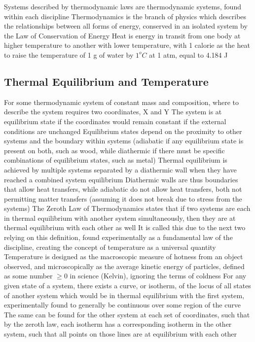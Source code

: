 \begin{outline*}
\2 Systems described by thermodynamic laws are thermodynamic systems, found within each discipline
\1 Thermodynamics is the branch of physics which describes the relationships between all forms of energy, conserved in an isolated system by the Law of Conservation of Energy
\2 Heat is energy in transit from one body at higher temperature to another with lower temperature, with 1 calorie as the heat to raise the temperature of 1 g of water by $1^oC$ at 1 atm, equal to 4.184 J
\end{outline*}
\subsection{Thermal Equilibrium and Temperature}
\begin{outline*}
\1 For some thermodynamic system of constant mass and composition, where to describe the system requires two coordinates, X and Y
\2 The system is at equilibrium state if the coordinates would remain constant if the external conditions are unchanged
\2 Equilibrium states depend on the proximity to other systems and the boundary within systems (adiabatic if any equilibrium state is present on both, such as wood, while diathermic if there must be specific combinations of equilibrium states, such as metal)
\3 Thermal equilibrium is achieved by multiple systems separated by a diathermic wall when they have reached a combined system equilibrium
\3 Diathermic walls are thus boundaries that allow heat transfers, while adiabatic do not allow heat transfers, both not permitting matter transfers (assuming it does not break due to stress from the systems)
\2 The Zeroth Law of Thermodynamics states that if two systems are each in thermal equilibrium with another system simultaneously, then they are at thermal equilibrium with each other as well
\3 It is called this due to the next two relying on this definition, found experimentally as a fundamental law of the discipline, creating the concept of temperature as a universal quantity
\1 Temperature is designed as the macroscopic measure of hotness from an object observed, and microscopically as the average kinetic energy of particles, defined as some number $\geq 0$ in science (Kelvin), ignoring the terms of coldness
\2 For any given state of a system, there exists a curve, or isotherm, of the locus of all states of another system which would be in thermal equilibrium with the first system, experimentally found to generally be continuous over some region of the curve
\3 The same can be found for the other system at each set of coordinates, such that by the zeroth law, each isotherm has a corresponding isotherm in the other system, such that all points on those lines are at equilibrium with each other

\end{outline*}
